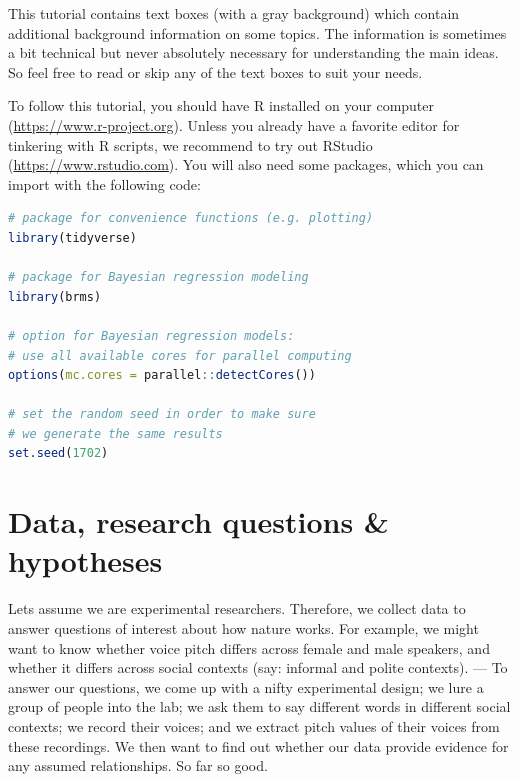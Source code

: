 \documentclass[nobib]{tufte-handout}
\begin{document}
This tutorial contains text boxes (with a gray background) which contain additional background information on some topics.
The information is sometimes a bit technical but never absolutely necessary for understanding the main ideas.
So feel free to read or skip any of the text boxes to suit your needs.

To follow this tutorial, you should have R installed on your computer (\url{https://www.r-project.org}).
Unless you already have a favorite editor for tinkering with R scripts, we recommend to try out RStudio (\url{https://www.rstudio.com}).
You will also need some packages,
which you can import with the following code:

\bigskip

\begin{minipage}[]{\textwidth}
\begin{lstlisting}[language=R]
# package for convenience functions (e.g. plotting)
library(tidyverse)

# package for Bayesian regression modeling
library(brms)

# option for Bayesian regression models: 
# use all available cores for parallel computing
options(mc.cores = parallel::detectCores())

# set the random seed in order to make sure 
# we generate the same results
set.seed(1702)
\end{lstlisting}
\end{minipage}

\section{Data, research questions \& hypotheses}
\label{sec:data}

Lets assume we are experimental researchers. Therefore, we collect data to answer questions of interest about how nature works. For example, we might want to know whether voice pitch differs across female and male speakers, and whether it differs across social contexts (say: informal and polite contexts). --- To answer our questions, we come up with a nifty experimental design; we lure a group of people into the lab; we ask them to say different words in different social contexts; we record their voices; and we extract pitch values of their voices from these recordings. We then want to find out whether our data provide evidence for any assumed relationships. So far so good. 
\end{document}
